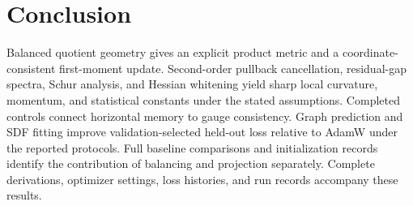 \section{Conclusion}
Balanced quotient geometry gives an explicit product metric and a
coordinate-consistent first-moment update. Second-order pullback
cancellation, residual-gap spectra, Schur analysis, and Hessian
whitening yield sharp local curvature, momentum, and statistical
constants under the stated assumptions. Completed controls connect
horizontal memory to gauge consistency. Graph prediction and SDF
fitting improve validation-selected held-out loss relative to AdamW
under the reported protocols. Full baseline comparisons and
initialization records identify the contribution of balancing and
projection separately. Complete derivations, optimizer settings,
loss histories, and run records accompany these results.
